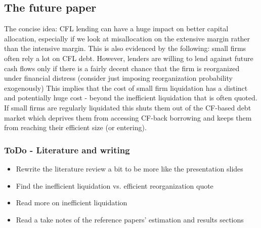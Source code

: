 \documentclass[12pt]{article}
\begin{document}
\subsection*{The future paper}

The concise idea: CFL lending can have a huge impact on better capital allocation, especially if we look at misallocation on the extensive margin rather than the intensive margin. This is also evidenced by the following: small firms often rely a lot on CFL debt. However, lenders are willing to lend against future cash flows only if there is a fairly decent chance that the firm is reorganized under financial distress (consider just imposing reorganization probability exogenously) This implies that the cost of small firm liquidation has a distinct and potentially huge cost - beyond the inefficient liquidation that is often quoted. If small firms are regularly liquidated this shuts them out of the CF-based debt market which deprives them from accessing CF-back borrowing and keeps them from reaching their efficient size (or entering).

\newpage

\subsubsection*{ToDo - Literature and writing}
\begin{itemize}\setlength\itemsep{0em} \small
    \item Rewrite the literature review a bit to be more like the presentation slides
    \item Find the inefficient liquidation vs. efficient reorganization quote \checkmark 
    \item Read more on inefficient liquidation \checkmark
    \item Read a take notes of the reference papers' estimation and results sections \checkmark
\end{itemize} \normalsize
\end{document}
